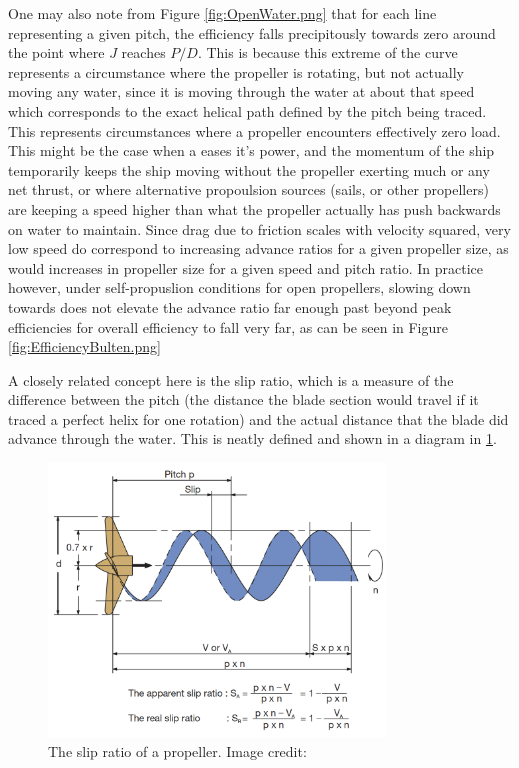 \documentclass{article}\usepackage[]{graphicx}\usepackage[]{color}
\begin{document}
One may also note from Figure \ref{fig:OpenWater.png} that for each line representing a given pitch, the efficiency falls precipitously towards zero around the point where $J$ reaches $P/D$. This is because this extreme of the curve represents a circumstance where the propeller is rotating, but not actually moving any water, since it is moving through the water at about that speed which corresponds to the exact helical path defined by the pitch being traced. This represents circumstances where a propeller encounters effectively zero load.  This might be the case when a eases it's power, and the momentum of the ship temporarily keeps the ship moving without the propeller exerting much or any net thrust, or where alternative propoulsion sources (sails, or other propellers) are keeping a speed higher than what the propeller actually has push backwards on water to maintain.  Since drag due to friction scales with velocity squared, very low speed do correspond to increasing advance ratios for a given propeller size, as would increases in propeller size for a given speed and pitch ratio. In practice however, under self-propuslion conditions for open propellers, slowing down towards does not elevate the advance ratio far enough past beyond peak efficiencies for overall efficiency to fall very far, as can be seen in Figure \ref{fig:EfficiencyBulten.png}

A closely related concept here is the slip ratio, which is a measure of the difference between the pitch (the distance the blade section would travel if it traced a perfect helix for one rotation) and the actual distance that the blade did advance through the water.  This is neatly defined and shown in a diagram in \ref{fig:SlipRatio.png}.

\begin{figure}[h]
\captionsetup{width=0.8\textwidth}
\includegraphics[width=0.8\textwidth, center]{SlipRatio.png}
\caption{The slip ratio of a propeller. Image credit: \cite{MAN2017}}
\label{fig:SlipRatio.png}
\end{figure}
\end{document}

